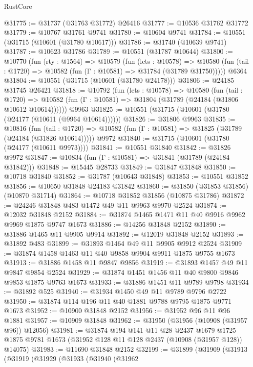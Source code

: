 \begin{lexlean}{RustCore}
\begin{coremodule}
@31775 := @31737 (@31763 @31772) @26416
@31777 := @10536 @31762 @31772
@31779 := @10767 @31761 @9741
@31780 := @10604 @9741
@31784 := @10551 (@31715 (@10601 (@31780 @10617)))
@31786 := @31740 (@10639 @9741)
@31787 := @10623 @31786
@31789 := @10551 (@31787 @10644)
@31800 := @10770
    (fun (rty : @1564) =>
    @10579
      (fun (lets : @10578) =>
      @10580 (fun (tail : @1720) => @10582 (fun (Γ : @10581) => @31784 (@31789 @31750)))))
    @6364
@31804 := @10551 (@31715 (@10601 (@31780 @24178)))
@31806 := @24185 @31745 @26421
@31818 := @10792
    (fun (lets : @10578) =>
    @10580
      (fun (tail : @1720) =>
      @10582 (fun (Γ : @10581) => @31804 (@31789 (@24184 (@31806 @10612 @10614))))))
    @9963
@31825 := @10551 (@31715 (@10601 (@31780 (@24177 (@10611 (@9964 @10614))))))
@31826 := @31806 @9963
@31835 := @10816
    (fun (tail : @1720) => @10582 (fun (Γ : @10581) => @31825 (@31789 (@24184 (@31826 @10614)))))
    @9972
@31840 := @31715 (@10601 (@31780 (@24177 (@10611 @9973))))
@31841 := @10551 @31840
@31842 := @31826 @9972
@31847 := @10834 (fun (Γ : @10581) => @31841 (@31789 (@24184 @31842)))
@31848 := @15445 @28733
@31849 := @31847 @31848
@31850 := @10718 @31840
@31852 := @31787 (@10643 @31848)
@31853 := @10551 @31852
@31856 := @10650 @31848 @24183 @31842
@31860 := @31850 (@31853 @31856) (@10870 @31714)
@31864 := @10718 @31852 @31856 (@10875 @31786)
@31872 := @24246 @31848 @483 @1472 @49 @11 @9963 @9970 @2524
@31874 := @12032 @31848 @2152
@31884 := @31874 @1465 @1471 @11 @40 @9916 @9962 @9969 @1875 @9747 @1673
@31886 := @14256 @31848 @2152
@31890 := @31886 @1465 @11 @9905 @9914
@31892 := @12019 @31848 @2152
@31893 := @31892 @483
@31899 := @31893 @1464 @49 @11 @9905 @9912 @2524
@31909 := @31874 @1458 @1463 @11 @40 @9858 @9904 @9911 @1875 @9755 @1673
@31913 := @31886 @1458 @11 @9847 @9856
@31919 := @31893 @1457 @49 @11 @9847 @9854 @2524
@31929 := @31874 @1451 @1456 @11 @40 @9800 @9846 @9853 @1875 @9763 @1673
@31933 := @31886 @1451 @11 @9789 @9798
@31934 := @31892 @525
@31940 := @31934 @1450 @49 @11 @9789 @9796 @2722
@31950 := @31874 @114 @196 @11 @40 @1881 @9788 @9795 @1875 @9771 @1673
@31952 := @10900 @31848 @2152
@31956 := @31952 @96 @11 @96 @1881
@31957 := @10909 @31848
@31962 := @31950 (@31956 (@10908 (@31957 @96)) @12056)
@31981 := @31874
    @194
    @141
    @11
    @28
    @2437
    @1679
    @1725
    @1875
    @9781
    @1673
    (@31952 @128 @11 @128 @2437 (@10908 (@31957 @128)) @14075)
@31983 := @11690 @31848 @2152
@32199 := @31899
    (@31909
      (@31913
        (@31919
          (@31929
            (@31933
              (@31940
                (@31962

\end{coremodule}
\end{lexlean}

